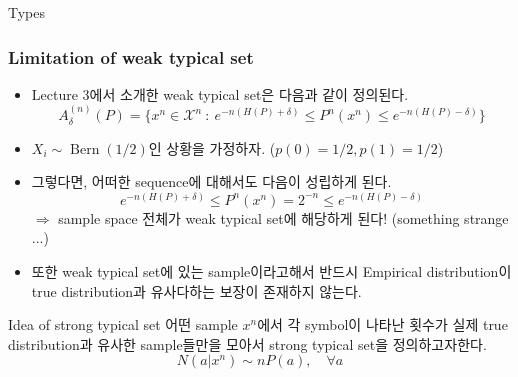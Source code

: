 \documentclass[9pt]{beamer}
\begin{document}
    \begin{section}{Types}
        \begin{frame}
            \frametitle{Limitation of weak typical set}
            \begin{itemize}
                \item Lecture 3에서 소개한 weak typical set은 다음과 같이 정의된다.
                $$ A^{(n)}_{\delta} (P) = \{x^n \in \mathcal X^n \ : \ e^{-n(H(P)+\delta)} \le P^n(x^n) \le e^{-n (H(P)-\delta)}\}$$
                \item $X_i \sim \operatorname{Bern}(1/2)$인 상황을 가정하자. ($p(0) = 1/2, p(1) = 1/2$)
                \item 그렇다면, 어떠한 sequence에 대해서도 다음이 성립하게 된다.
                $$e^{-n(H(P)+\delta)} \le P^n(x^n)  = {2^{-n}} \le e^{-n(H(P)-\delta)}$$
                $\Rightarrow$ sample space 전체가 weak typical set에 해당하게 된다! (something strange ...)
                \item 또한 weak typical set에 있는 sample이라고해서 반드시 Empirical distribution이 true distribution과 유사다하는 보장이 존재하지 않는다.
            \end{itemize}

            \vspace{0.2cm}
            \begin{block}{Idea of strong typical set}
                어떤 sample $x^n$에서 각 symbol이 나타난 횟수가 실제 true distribution과 유사한 sample들만을 모아서 strong typical set을 정의하고자한다.
                $$ N(a | x^n) \sim n P(a),\quad \forall a$$
            \end{block}
            
        \end{frame}


\end{section}
\end{document}
